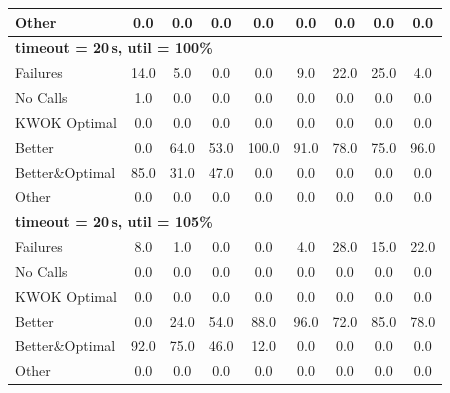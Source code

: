\begin{tabular}{l cccccccc}
Other & 0.0 & 0.0 & 0.0 & 0.0 & 0.0 & 0.0 & 0.0 & 0.0 \\
\midrule
\multicolumn{9}{l}{\textbf{timeout = 20\,s, util = 100\%}} \\
\midrule
Failures & 14.0 & 5.0 & 0.0 & 0.0 & 9.0 & 22.0 & 25.0 & 4.0 \\
No Calls & 1.0 & 0.0 & 0.0 & 0.0 & 0.0 & 0.0 & 0.0 & 0.0 \\
KWOK Optimal & 0.0 & 0.0 & 0.0 & 0.0 & 0.0 & 0.0 & 0.0 & 0.0 \\
Better & 0.0 & 64.0 & 53.0 & 100.0 & 91.0 & 78.0 & 75.0 & 96.0 \\
Better\&Optimal & 85.0 & 31.0 & 47.0 & 0.0 & 0.0 & 0.0 & 0.0 & 0.0 \\
Other & 0.0 & 0.0 & 0.0 & 0.0 & 0.0 & 0.0 & 0.0 & 0.0 \\
\midrule
\multicolumn{9}{l}{\textbf{timeout = 20\,s, util = 105\%}} \\
\midrule
Failures & 8.0 & 1.0 & 0.0 & 0.0 & 4.0 & 28.0 & 15.0 & 22.0 \\
No Calls & 0.0 & 0.0 & 0.0 & 0.0 & 0.0 & 0.0 & 0.0 & 0.0 \\
KWOK Optimal & 0.0 & 0.0 & 0.0 & 0.0 & 0.0 & 0.0 & 0.0 & 0.0 \\
Better & 0.0 & 24.0 & 54.0 & 88.0 & 96.0 & 72.0 & 85.0 & 78.0 \\
Better\&Optimal & 92.0 & 75.0 & 46.0 & 12.0 & 0.0 & 0.0 & 0.0 & 0.0 \\
Other & 0.0 & 0.0 & 0.0 & 0.0 & 0.0 & 0.0 & 0.0 & 0.0 \\
\bottomrule
\end{tabular}
